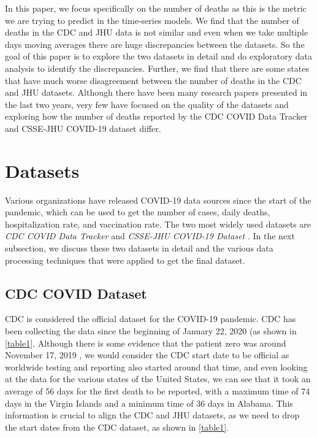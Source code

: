 \documentclass[11pt,twocolumn,letterpaper]{article}
\begin{document}
In this paper, we focus specifically on the number of deaths as this is the metric we are trying to predict in the time-series models. We find that the number of deaths in the CDC and JHU data is not similar and even when we take multiple days moving averages there are huge discrepancies between the datasets. So the goal of this paper is to explore the two datasets in detail and do exploratory data analysis to identify the discrepancies. Further, we find that there are some states that have much worse disagreement between the number of deaths in the CDC and JHU datasets. Although there have been many research papers presented in the last two years, very few have focused \cite{ref16} on the quality of the datasets and exploring how the number of deaths reported by the CDC COVID Data Tracker and CSSE-JHU COVID-19 dataset differ.

\section{Datasets}

Various organizations have released COVID-19 data sources since the start of the pandemic, which can be used to get the number of cases, daily deaths, hospitalization rate, and vaccination rate. The two most widely used datasets are \emph{CDC COVID Data Tracker} \cite{ref7} and \emph{CSSE-JHU COVID-19 Dataset} \cite{ref9}. In the next subsection, we discuss these two datasets in detail and the various data processing techniques that were applied to get the final dataset.

\subsection{CDC COVID Dataset}

CDC is considered the official dataset for the COVID-19 pandemic. CDC has been collecting the data since the beginning of January 22, 2020 (as shown in \cref{table1}. Although there is some evidence that the patient zero was around November 17, 2019 \cite{ref8}, we would consider the CDC start date to be official as worldwide testing and reporting also started around that time, and even looking at the data for the various states of the United States, we can see that it took an average of 56 days for the first death to be reported, with a maximum time of 74 days in the Virgin Islands and a minimum time of 36 days in Alabama. This information is crucial to align the CDC and JHU datasets, as we need to drop the start dates from the CDC dataset, as shown in \cref{table1}.
\end{document}
